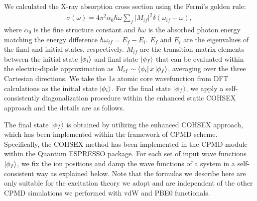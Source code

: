 \documentclass[prb,twocolumn,showpacs,preprintnumbers,superscriptaddress,amsmath,amssymb]{revtex4}
\begin{document}
We calculated the X-ray absorption cross section using the Fermi's golden rule:
\begin{align}\label{eq1}
\sigma(\omega)=4\pi^{2}\alpha_{0}\hbar\omega\sum_{f} | M_{if} |^{2} \delta(\omega_{if} - \omega),
\end{align}
where $\alpha_{0}$ is the fine structure constant and
$\hbar\omega$ is the absorbed photon energy matching the energy difference ${ \hbar\omega_{if} = E_{f} - E_{i} }$.
$E_{f}$ and $E_{i}$ are the eigenvalues of the final and initial states, respectively.
$M_{if}$ are the transition matrix elements between the initial state $\ket{\phi_{i}}$
and final state $\ket{\phi_{f}}$ that can be evaluated within the electric-dipole approximation as
$M_{if} \sim \bra{\phi_{i}} x \ket{\phi_{f}}$,
averaging over the three Cartesian directions.
We take the 1$s$ atomic core wavefunction from DFT calculations as the initial state $\ket{\phi_{i}}$.
For the final state $\ket{\phi_{f}}$, we apply a self-consistently diagonalization procedure
within the enhanced static COHSEX approach\cite{kang2010enhanced} and the details are as follows.

The final state $\ket{\phi_{f}}$ is obtained by utilizing the enhanced COHSEX approach,
which has been implemented within the framework of CPMD\cite{85L-CPMD} scheme.
Specifically, the COHSEX method has been implemented in the CPMD module within the Quantum ESPRESSO package.\cite{codeQE}
For each set of input wave functions $\ket{\phi_{f}}$, we fix
the ion positions and damp the wave functions of a system in a self-consistent way as explained below.
Note that the formulas we describe here are only suitable for the excitation theory we adopt
and are independent of the other CPMD simulations we performed with vdW and PBE0 functionals.
\end{document}
